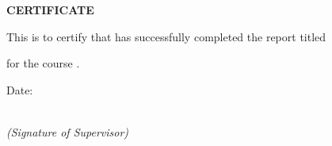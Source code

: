\documentclass[12pt]{article}
\begin{document}
\begin{center}
{\LARGE \textbf{CERTIFICATE}}
\end{center}

\vspace{1.5cm}

This is to certify that \underline{\hspace{6cm}} has successfully completed the report titled

\vspace{0.5cm}

\centerline{\underline{\hspace{10cm}}}

\vspace{0.5cm}
for the course \underline{\hspace{6cm}}.

\vspace{2cm}



\begin{flushright}

Date: \underline{\hspace{4cm}}
\vspace{2cm}


\underline{\hspace{7cm}} \\
\textit{(Signature of Supervisor)}

\end{flushright}
\end{document}
